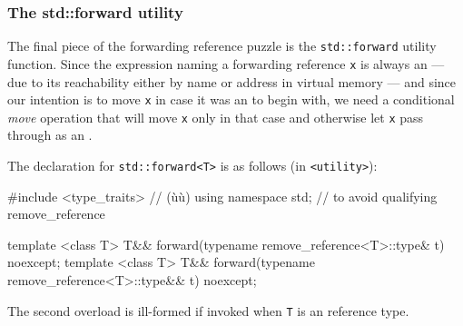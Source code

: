 \subsubsection[The \lstinline!std::forward! utility]{The {\SubsubsecCode std::forward} utility}\label{the-std::forward-utility}

The final piece of the forwarding reference puzzle is the
\lstinline!std::forward! utility function. Since the expression naming a
forwarding reference \lstinline!x! is always an  --- due to its
reachability either by name or address in virtual memory --- and since our
intention is to move \lstinline!x! in case it was an  to begin
with, we need a conditional \emph{move} operation that will move
\lstinline!x! only in that case and otherwise let \lstinline!x! pass through as
an .

The declaration for \lstinline!std::forward<T>! is as follows (in
\lstinline!<utility>!):

\begin{emcppshiddenlisting}[emcppsbatch=e7]
#include <type_traits>  // (ù{}ù)
using namespace std; // to avoid qualifying remove_reference
\end{emcppshiddenlisting}
\begin{emcppslisting}[emcppsbatch=e7]
template <class T> T&& forward(typename remove_reference<T>::type& t) noexcept;
template <class T> T&& forward(typename remove_reference<T>::type&& t) noexcept;
\end{emcppslisting}

\noindent The second overload is ill-formed if invoked when \lstinline!T! is an
 reference type.

